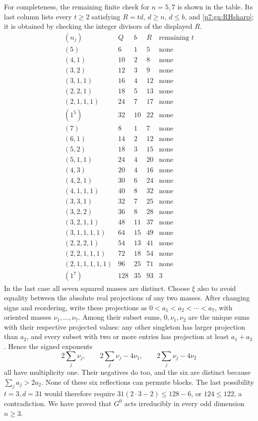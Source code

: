 \documentclass[11pt,a4paper]{article}
\theoremstyle{definition}
\theoremstyle{remark}
\numberwithin{equation}{section}
\begin{document}
For completeness, the remaining finite check for $n=5,7$ is shown
in the table. Its last column lists every $t\ge2$ satisfying
$R=td$, $d\ge n$, $d\le b$, and \eqref{p7:gn:RHsharp}; it is obtained
by checking the integer divisors of the displayed $R$.
\[
\begin{array}{c|r|r|r|c}
(n_j)&Q&b&R&\text{remaining }t\\\hline
(5)&6&1&5&\text{none}\\
(4,1)&10&2&8&\text{none}\\
(3,2)&12&3&9&\text{none}\\
(3,1,1)&16&4&12&\text{none}\\
(2,2,1)&18&5&13&\text{none}\\
(2,1,1,1)&24&7&17&\text{none}\\
(1^5)&32&10&22&\text{none}\\\hline
(7)&8&1&7&\text{none}\\
(6,1)&14&2&12&\text{none}\\
(5,2)&18&3&15&\text{none}\\
(5,1,1)&24&4&20&\text{none}\\
(4,3)&20&4&16&\text{none}\\
(4,2,1)&30&6&24&\text{none}\\
(4,1,1,1)&40&8&32&\text{none}\\
(3,3,1)&32&7&25&\text{none}\\
(3,2,2)&36&8&28&\text{none}\\
(3,2,1,1)&48&11&37&\text{none}\\
(3,1,1,1,1)&64&15&49&\text{none}\\
(2,2,2,1)&54&13&41&\text{none}\\
(2,2,1,1,1)&72&18&54&\text{none}\\
(2,1,1,1,1,1)&96&25&71&\text{none}\\
(1^7)&128&35&93&3
\end{array}
\]
In the last case all seven squared masses are distinct. Choose
$\xi$ also to avoid equality between the absolute real projections
of any two masses. After changing signs and reordering, write these
projections as $0<a_1<a_2<\cdots<a_7$, with oriented masses
$\nu_1,\ldots,\nu_7$. Among their subset sums, $0,\nu_1,\nu_2$
are the unique sums with their respective projected values:
any other singleton has larger projection than $a_2$, and every
subset with two or more entries has projection at least $a_1+a_2$.
Hence the signed exponents
\[
 2\sum_j\nu_j,\qquad 2\sum_j\nu_j-4\nu_1,\qquad
 2\sum_j\nu_j-4\nu_2
\]
all have multiplicity one. Their negatives do too, and the six
are distinct because $\sum_ja_j>2a_2$.
None of these six reflections can permute blocks. The last
possibility $t=3,d=31$ would therefore require
$31(2\cdot3-2)\le128-6$, or $124\le122$, a contradiction.
We have proved that $G^0$ acts irreducibly in every odd dimension
$n\ge3$.
\end{document}

